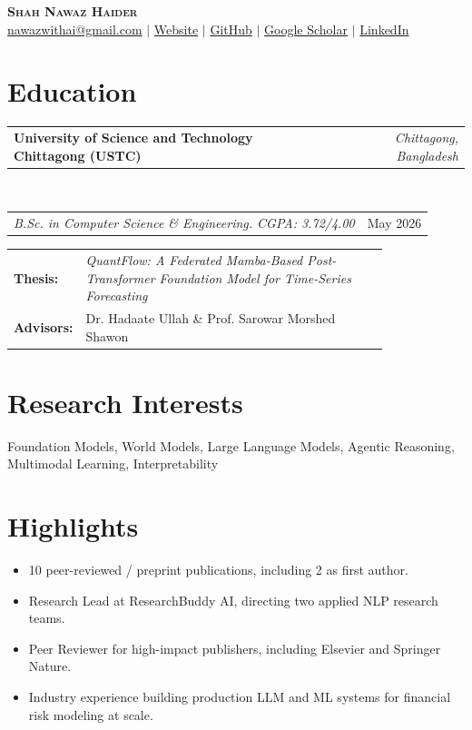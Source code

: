 \documentclass[10pt]{article}
\makeatletter
\newcommand{\entry}[2]{%
  \noindent\begin{tabularx}{\linewidth}{@{}X r@{}}
    \textbf{#1} & \textit{\small #2}
  \end{tabularx}\vspace{-1pt}
}
\newcommand{\subentry}[2]{%
  \noindent\begin{tabularx}{\linewidth}{@{}X r@{}}
    \textit{\small #1} & {\small #2}
  \end{tabularx}\vspace{1pt}
}
\makeatother
\begin{document}
\begin{center}
  {\Huge\bfseries\scshape Shah Nawaz Haider}\\[5pt]
  {\small
    \href{mailto:nawazwithai@gmail.com}{nawazwithai@gmail.com} \quad$|$\quad
    \href{https://nawaz.pro.bd}{Website} \quad$|$\quad
    \href{https://github.com/nawaz0x1}{GitHub} \quad$|$\quad
    \href{https://scholar.google.com/citations?user=KNOs9BkAAAAJ&hl=en}{Google Scholar} \quad$|$\quad
    \href{https://www.linkedin.com/in/nawazhaider/}{LinkedIn}
  }
\end{center}

\section{Education}
\entry{University of Science and Technology Chittagong (USTC)}{Chittagong, Bangladesh}\\[1pt]
\subentry{B.Sc. in Computer Science \& Engineering. CGPA: 3.72/4.00}{May 2026}
\vspace{2pt}
\hspace*{14pt}
\begin{tabular}{@{}l p{0.82\linewidth}@{}}
\textbf{Thesis:}     & \textit{QuantFlow: A Federated Mamba-Based Post-Transformer Foundation Model for Time-Series Forecasting} \\
\textbf{Advisors:} & Dr. Hadaate Ullah \& Prof. Sarowar Morshed Shawon
\end{tabular}


\section{Research Interests}
Foundation Models, World Models, Large Language Models, Agentic Reasoning, Multimodal Learning, Interpretability

\section{Highlights}
\begin{itemize}
  \item 10 peer-reviewed / preprint publications, including 2 as first author.
  \item Research Lead at ResearchBuddy AI, directing two applied NLP research teams.
  \item Peer Reviewer for high-impact publishers, including Elsevier and Springer Nature.
  \item Industry experience building production LLM and ML systems for financial risk modeling at scale.
\end{itemize}
\end{document}

